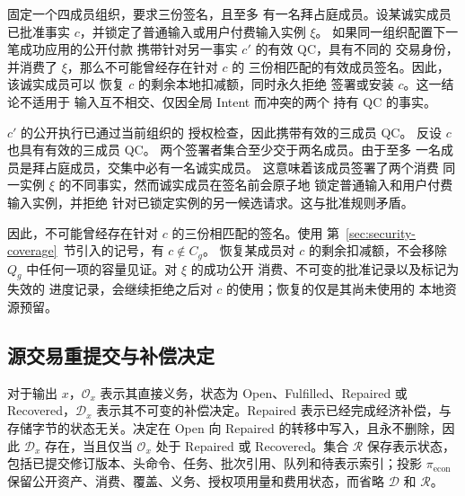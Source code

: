 \begin{lemma}[被取代的部分批准]
\label{lem:security-superseded}
固定一个四成员组织，要求三份签名，且至多
有一名拜占庭成员。设某诚实成员已批准事实
$c$，并锁定了普通输入或用户付费输入实例 $\xi$。
如果同一组织配置下一笔成功应用的公开付款
携带针对另一事实 $c'$ 的有效 QC，具有不同的
交易身份，并消费了 $\xi$，那么不可能曾经存在针对 $c$ 的
三份相匹配的有效成员签名。因此，该诚实成员可以
恢复 $c$ 的剩余本地扣减额，同时永久拒绝
签署或安装 $c$。这一结论不适用于
输入互不相交、仅因全局 Intent 而冲突的两个
持有 QC 的事实。
\end{lemma}

\begin{IEEEproof}
$c'$ 的公开执行已通过当前组织的
授权检查，因此携带有效的三成员 QC。
反设 $c$ 也具有有效的三成员 QC。
两个签署者集合至少交于两名成员。由于至多
一名成员是拜占庭成员，交集中必有一名诚实成员。
这意味着该成员签署了两个消费
同一实例 $\xi$ 的不同事实，然而诚实成员在签名前会原子地
锁定普通输入和用户付费输入实例，并拒绝
针对已锁定实例的另一候选请求。这与批准规则矛盾。

因此，不可能曾经存在针对 $c$ 的三份相匹配的签名。使用
第~\ref{sec:security-coverage}~节引入的记号，有 $c\notin C_g$。
恢复某成员对 $c$ 的剩余扣减额，不会移除
$Q_g$ 中任何一项的容量见证。对 $\xi$ 的成功公开
消费、不可变的批准记录以及标记为失效的
进度记录，会继续拒绝之后对 $c$ 的使用；恢复的仅是其尚未使用的
本地资源预留。
\end{IEEEproof}

\subsection{源交易重提交与补偿决定}
\label{sec:security-decision}

对于输出 $x$，$\mathcal O_x$ 表示其直接义务，状态为 Open、Fulfilled、Repaired 或 Recovered，$\mathcal D_x$ 表示其不可变的补偿决定。Repaired 表示已经完成经济补偿，与存储字节的状态无关。决定在 Open 向 Repaired 的转移中写入，且永不删除，因此 $\mathcal D_x$ 存在，当且仅当 $\mathcal O_x$ 处于 Repaired 或 Recovered。集合 $\mathcal R$ 保存表示状态，包括已提交修订版本、头命令、任务、批次引用、队列和待表示索引；投影 $\pi_{\mathrm{econ}}$ 保留公开资产、消费、覆盖、义务、授权项用量和费用状态，而省略 $\mathcal D$ 和 $\mathcal R$。

